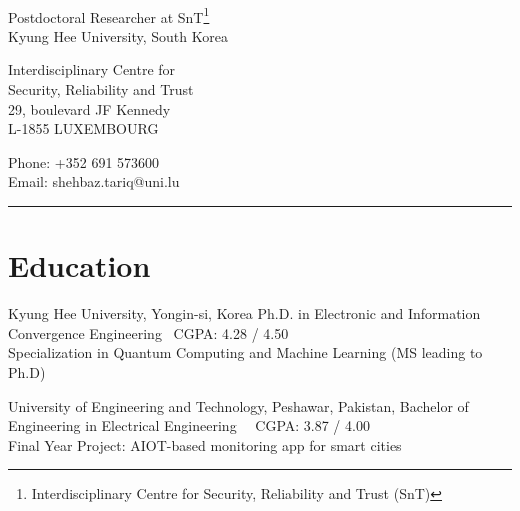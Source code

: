 \documentclass[10pt]{article}
\begin{document}
\begin{center}
\vspace{2mm}\\
Postdoctoral Researcher at SnT\footnote{Interdisciplinary Centre for Security, Reliability and Trust (SnT)}\\
Kyung Hee University, South Korea\\
\end{center}

\noindent\parbox[t]{7cm}{%
  \small

Interdisciplinary Centre for \\ Security, Reliability and Trust \\
29, boulevard JF Kennedy \\ L-1855 LUXEMBOURG}
\hfill
\noindent\parbox[t]{6cm}{%
  \small
  \phantom{XXXXXXXa} Phone: +352 691 573600\\
\phantom{XXXXXXXa} Email: shehbaz.tariq@uni.lu \\ 
  \phantom{XXXXXXXXXXXXa} \href{https://github.com/ShehbazTariq}{\scalebox{1.5}{\faGithub}} \quad
  \href{https://scholar.google.com/citations?user=pOJIAhYAAAAJ&hl=en&oi=ao}{\scalebox{1.5}{\faGraduationCap}} \quad
  \href{https://www.linkedin.com/in/shehbaz-tariq/}{\scalebox{1.5}{\faLinkedin}}
}
\rule[-0.125in]{6.5in}{1pt}

\section*{Education}
\begin{mylist}


\item
    {Kyung Hee University, Yongin-si, Korea%
    }
    {Ph.D. in Electronic and Information Convergence Engineering \,\,\,\quad\qquad\qquad\qquad CGPA: 4.28 / 4.50\\ Specialization in Quantum Computing and Machine Learning (MS leading to Ph.D)}
    {\vspace*{-5mm}
    }


\item
    {University of Engineering and Technology, Peshawar, Pakistan,%
    }
    {Bachelor of Engineering in Electrical Engineering
    \,\,\,\,\,\,\quad\qquad\qquad\qquad\quad\qquad\qquad CGPA: 3.87 / 4.00\\
    Final Year Project: AIOT-based monitoring app for smart cities}

\end{mylist}
\end{document}
